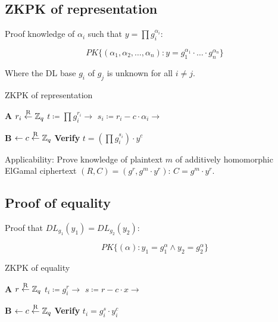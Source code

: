 \subsection{ZKPK of representation}

Proof knowledge of $\alpha_i$ such that $y = \prod g_i^{\alpha_i}$:

\[
		PK\{ (\alpha_1, \alpha_2, \ldots, \alpha_n) : y = g_1^{\alpha_1} \cdot \ldots \cdot g_n^{\alpha_n} \}
\]

Where the DL base $g_i$ of $g_j$ is unknown for all $i \neq j$.

\begin{algorithm}
		\caption{ZKPK of representation}

		\begin{multicols}{2}
				\begin{algorithmic}[0]
						\State \textbf{A}
						\State $r_i \overset{\mathrm{R}}{\gets} \mathbb{Z}_q$
						\State $t \coloneqq \prod g_i^{r_i} \rightarrow$
						\State
						\State $s_i \coloneqq r_i - c \cdot \alpha_i \rightarrow$
				\end{algorithmic}

				\columnbreak

				\begin{algorithmic}[0]
						\State \textbf{B}
						\State
						\State
						\State $\leftarrow c \overset{\mathrm{R}}{\gets} \mathbb{Z}_q$
						\State \textbf{Verify} $t = (\prod g_i^{s_i}) \cdot y^c$
				\end{algorithmic}
		\end{multicols}
\end{algorithm}

Applicability: Prove knowledge of plaintext $m$ of additively homomorphic
ElGamal ciphertext $(R, C) = (g^r, g^m \cdot y^r)$: $C = g^m \cdot y^r$.

\subsection{Proof of equality}

Proof that $DL_{g_1}(y_1) = DL_{g_2}(y_2)$:

\[
		PK\{ (\alpha) : y_1 = g_1^\alpha \land y_2 = g_2^\alpha \}
\]

\begin{algorithm}
		\caption{ZKPK of equality}

		\begin{multicols}{2}
				\begin{algorithmic}[0]
						\State \textbf{A}
						\State $r \overset{\mathrm{R}}{\gets} \mathbb{Z}_q$
						\State $t_i \coloneqq g_i^r \rightarrow$
						\State
						\State $s \coloneqq r - c \cdot x \rightarrow$
				\end{algorithmic}

				\columnbreak

				\begin{algorithmic}[0]
						\State \textbf{B}
						\State
						\State
						\State $\leftarrow c \overset{\mathrm{R}}{\gets} \mathbb{Z}_q$
						\State
						\State \textbf{Verify} $t_i = g_i^s \cdot y_i^c$
				\end{algorithmic}
		\end{multicols}
\end{algorithm}

